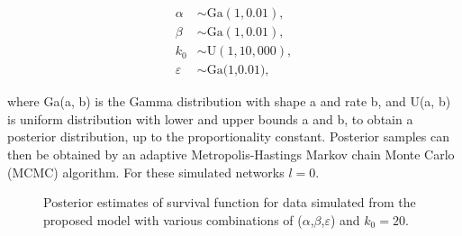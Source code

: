 \documentclass[
  sn-basic,
]{sn-jnl}
\theoremstyle{plain}
\theoremstyle{plain}
\theoremstyle{remark}
\begin{document}
\begin{align*}
\alpha&\sim \text{Ga}(1,0.01),\\
\beta &\sim  \text{Ga}(1,0.01),\\
k_0 &\sim \text{U}(1,10,000),\\
\varepsilon &\sim \text{Ga(1,0.01)},
\end{align*}

where Ga(a, b) is the Gamma distribution with shape a and rate b, and
U(a, b) is uniform distribution with lower and upper bounds a and b, to
obtain a posterior distribution, up to the proportionality constant.
Posterior samples can then be obtained by an adaptive
Metropolis-Hastings Markov chain Monte Carlo (MCMC) algorithm. For these
simulated networks \(l=0\).

\begin{figure}


\caption{\label{fig-rec1}Posterior estimates of survival function for
data simulated from the proposed model with various combinations of
(\(\alpha\),\(\beta\),\(\varepsilon\)) and \(k_0=20\).}

\end{figure}%
\end{document}

